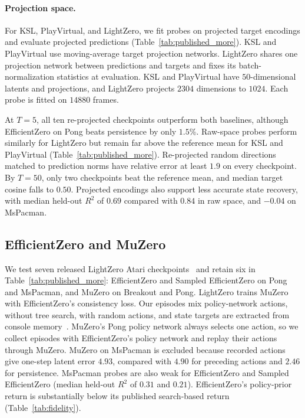\paragraph{Projection space.} For KSL, PlayVirtual, and LightZero, we fit probes on projected target encodings and evaluate projected predictions (Table~\ref{tab:published_more}). KSL and PlayVirtual use moving-average target projection networks. LightZero shares one projection network between predictions and targets and fixes its batch-normalization statistics at evaluation. KSL and PlayVirtual have $50$-dimensional latents and projections, and LightZero projects $2304$ dimensions to $1024$. Each probe is fitted on $14880$ frames.

At $T=5$, all ten re-projected checkpoints outperform both baselines, although EfficientZero on Pong beats persistence by only $1.5$\%. Raw-space probes perform similarly for LightZero but remain far above the reference mean for KSL and PlayVirtual (Table~\ref{tab:published_more}). Re-projected random directions matched to prediction norms have relative error at least $1.9$ on every checkpoint. By $T=50$, only two checkpoints beat the reference mean, and median target cosine falls to $0.50$. Projected encodings also support less accurate state recovery, with median held-out $R^2$ of $0.69$ compared with $0.84$ in raw space, and $-0.04$ on MsPacman.



\subsection{EfficientZero and MuZero}
\label{app:lightzero}
We test seven released LightZero Atari checkpoints~\citep{niu2023lightzero} and retain six in Table~\ref{tab:published_more}: EfficientZero and Sampled EfficientZero on Pong and MsPacman, and MuZero on Breakout and Pong. LightZero trains MuZero with EfficientZero's consistency loss. Our episodes mix policy-network actions, without tree search, with random actions, and state targets are extracted from console memory~\citep{Anand2019AtariARI}. MuZero's Pong policy network always selects one action, so we collect episodes with EfficientZero's policy network and replay their actions through MuZero. MuZero on MsPacman is excluded because recorded actions give one-step latent error $4.93$, compared with $4.90$ for preceding actions and $2.46$ for persistence. MsPacman probes are also weak for EfficientZero and Sampled EfficientZero (median held-out $R^2$ of $0.31$ and $0.21$). EfficientZero's policy-prior return is substantially below its published search-based return (Table~\ref{tab:fidelity}).

